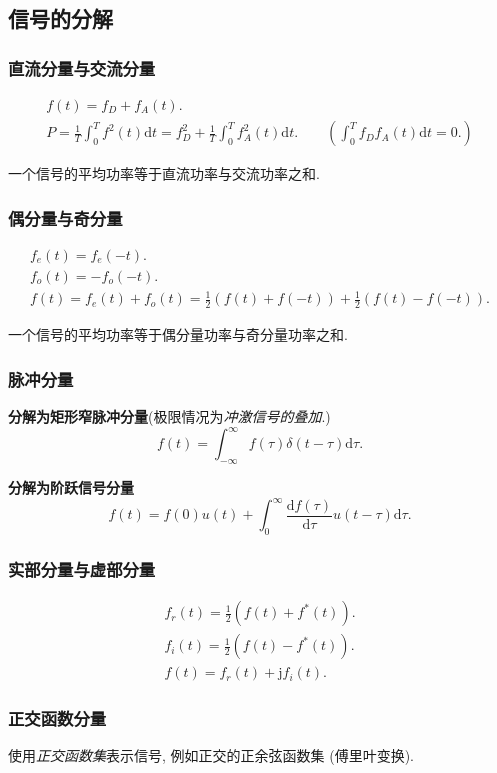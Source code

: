 \subsection{信号的分解}

\subsubsection{直流分量与交流分量}

\rmg
\begin{gather}
    f(t)=f_D+f_A(t). \\
    P=\frac{1}{T}\int_{0}^{T}f^2(t)\mathrm{d}t=f_D^2+\frac{1}{T}\int_{0}^{T}f_A^2(t)\mathrm{d}t.\qquad \left(\int_{0}^{T}f_Df_A(t)\mathrm{d}t=0.\right)
\end{gather}

一个信号的平均功率等于直流功率与交流功率之和.

\subsubsection{偶分量与奇分量}

\rmg
\begin{gather}
    f_e(t)=f_e(-t). \\
    f_o(t)=-f_o(-t). \\
    f(t)=f_e(t)+f_o(t)=\frac{1}{2}(f(t)+f(-t))+\frac{1}{2}(f(t)-f(-t)).
\end{gather}

一个信号的平均功率等于偶分量功率与奇分量功率之和.

\subsubsection{脉冲分量}

\textbf{分解为矩形窄脉冲分量}\quad (极限情况为\textit{冲激信号的叠加}.)
\begin{equation}
    f(t)=\int_{-\infty}^{\infty}f(\tau)\delta(t-\tau)\mathrm{d}\tau.
\end{equation}

\textbf{分解为阶跃信号分量}
\begin{equation}
    f(t)=f(0)u(t)+\int_{0}^{\infty}\frac{\mathrm{d}f(\tau)}{\mathrm{d}\tau}u(t-\tau)\mathrm{d}\tau.
\end{equation}

\subsubsection{实部分量与虚部分量}

\rmg
\begin{gather}
    f_r(t)=\frac{1}{2}(f(t)+f^*(t)). \\
    f_i(t)=\frac{1}{2}(f(t)-f^*(t)). \\
    f(t)=f_r(t)+\mathrm{j}f_i(t).
\end{gather}

\subsubsection{正交函数分量}

使用\textit{正交函数集}表示信号, 例如正交的正余弦函数集 (傅里叶变换).
